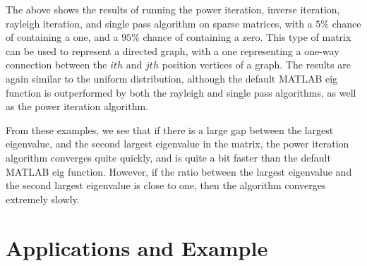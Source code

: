 \documentclass[11pt]{amsart}
\begin{document}

The above shows the results of running the power iteration, inverse iteration, rayleigh iteration, and single pass algorithm on sparse matrices, with a $5\%$ chance of containing a one, and a $95\%$ chance of containing a zero. This type of matrix can be used to represent a directed graph, with a one representing a one-way connection between the $ith$ and $jth$ position vertices of a graph. The results are again similar to the uniform distribution, although the default MATLAB eig function is outperformed by both the rayleigh and single pass algorithms, as well as the power iteration algorithm.


From these examples, we see that if there is a large gap between the largest eigenvalue, and the second largest eigenvalue in the matrix, the power iteration algorithm converges quite quickly, and is quite a bit faster than the default MATLAB eig function. However, if the ratio between the largest eigenvalue and the second largest eigenvalue is close to one, then the algorithm converges extremely slowly.

\section{Applications and Example}

\end{document}
